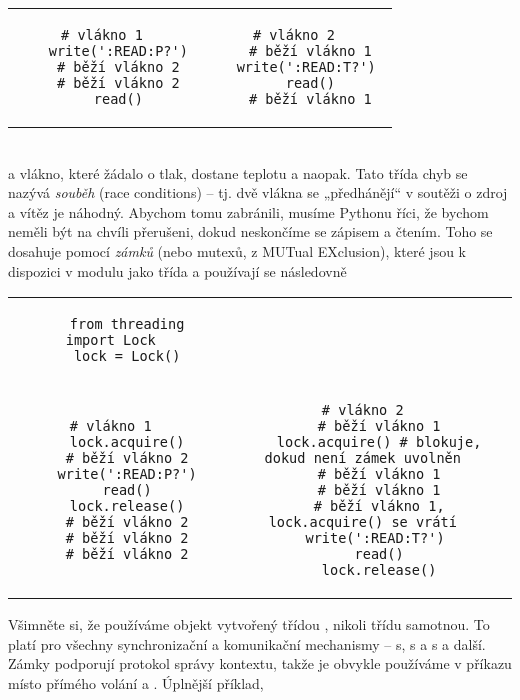 \begin{tabular}{cc}
\begin{lstlisting}[linewidth=0.49\linewidth]
    # vlákno 1
    write(':READ:P?')
    # běží vlákno 2
    # běží vlákno 2
    read()
\end{lstlisting}&
\begin{lstlisting}[linewidth=0.49\linewidth]
    # vlákno 2
    # běží vlákno 1
    write(':READ:T?') 
    read()
    # běží vlákno 1
\end{lstlisting}
\end{tabular}\\
a vlákno, které žádalo o tlak, dostane teplotu a naopak. Tato třída chyb se nazývá \emph{souběh} (race conditions) -- tj. dvě vlákna se „předhánějí“ v soutěži o zdroj a vítěz je náhodný. Abychom tomu zabránili, musíme Pythonu říci, že bychom neměli být na chvíli přerušeni, dokud neskončíme se zápisem a čtením. Toho se dosahuje pomocí \emph{zámků} (nebo mutexů, z MUTual EXclusion), které jsou k dispozici v modulu  jako třída  a používají se následovně\\
\begin{tabular}{cc}
\begin{lstlisting}
    from threading import Lock
    lock = Lock()
\end{lstlisting}& \\
\begin{lstlisting}[linewidth=0.4\linewidth]
    # vlákno 1
    lock.acquire()
    # běží vlákno 2
    write(':READ:P?')
    read()
    lock.release()
    # běží vlákno 2
    # běží vlákno 2
    # běží vlákno 2
\end{lstlisting}&
\begin{lstlisting}[linewidth=0.6\linewidth]
    # vlákno 2
    # běží vlákno 1
    lock.acquire() # blokuje, dokud není zámek uvolněn
    # běží vlákno 1
    # běží vlákno 1
    # běží vlákno 1, lock.acquire() se vrátí
    write(':READ:T?') 
    read()
    lock.release()
\end{lstlisting}
\end{tabular}

Všimněte si, že používáme objekt vytvořený třídou , nikoli třídu samotnou. To platí pro všechny synchronizační a komunikační mechanismy -- s, s a s a další. Zámky podporují protokol správy kontextu, takže je obvykle používáme v příkazu  místo přímého volání  a . Úplnější příklad,


